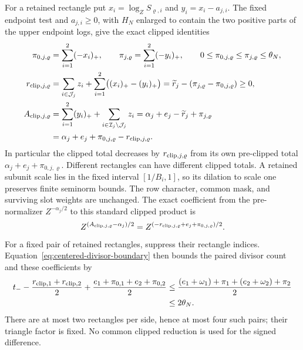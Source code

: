 \documentclass[11pt,a4paper]{article}
\numberwithin{equation}{section}
\numberwithin{figure}{section}
\theoremstyle{definition}
\theoremstyle{remark}
\begin{document}
For a retained rectangle put
\(x_i=\log_ZS_{\varrho,i}\) and \(y_i=x_i-a_{j,i}\).  The fixed
endpoint test and \(a_{j,i}\ge0\), with \(H_N\) enlarged to contain
the two positive parts of the upper endpoint logs, give the exact clipped identities
\begin{equation}
 \begin{aligned}
 \pi_{0,j,\varrho}&=\sum_{i=1}^2(-x_i)_+,\qquad
 \pi_{j,\varrho}=\sum_{i=1}^2(-y_i)_+,
 \qquad 0\le\pi_{0,j,\varrho}\le\pi_{j,\varrho}\le\theta_N,\\
 r_{{\rm clip},j,\varrho}
 &=\sum_{i\in\mathcal J_j}z_i+
       \sum_{i=1}^2\bigl((x_i)_+-(y_i)_+\bigr)
 =\widetilde r_j-(\pi_{j,\varrho}-\pi_{0,j,\varrho})\ge0,\\
 A_{{\rm clip},j,\varrho}
 &=\sum_{i=1}^2(y_i)_++\sum_{i\in\mathcal I_j\setminus\mathcal J_j}z_i
 =\alpha_j+e_j-\widetilde r_j+\pi_{j,\varrho}\\
 &=\alpha_j+e_j+\pi_{0,j,\varrho}-r_{{\rm clip},j,\varrho}.
 \end{aligned}
 \label{eq:centered-clipped-rectangle}
\end{equation}
In particular the clipped total decreases by \(r_{{\rm clip},j,\varrho}\)
from its own pre-clipped total \(\alpha_j+e_j+\pi_{0,j,\varrho}\).
Different rectangles can have different clipped totals.  A retained
subunit scale lies in the fixed interval \([1/B_i,1]\), so its dilation
to scale one preserves finite seminorm bounds.  The row character, common
mask, and surviving slot weights are unchanged.  The exact coefficient
from the pre-normalizer \(Z^{-\alpha_j/2}\) to this standard clipped
product is
\[
 Z^{(A_{{\rm clip},j,\varrho}-\alpha_j)/2}
 =Z^{(-r_{{\rm clip},j,\varrho}+e_j+\pi_{0,j,\varrho})/2}.
\]
For a fixed pair of retained rectangles, suppress their rectangle indices.
Equation~\eqref{eq:centered-divisor-boundary} then bounds the paired
divisor count and these coefficients by
\begin{equation}
 \begin{split}
 t_- -\frac{r_{{\rm clip},1}+r_{{\rm clip},2}}2
     +\frac{e_1+\pi_{0,1}+e_2+\pi_{0,2}}2
 &\le\frac{(e_1+\omega_1)+\pi_1+(e_2+\omega_2)+\pi_2}{2}\\
 &\le2\theta_N.
 \end{split}
 \label{eq:centered-clipped-shell}
\end{equation}
There are at most two rectangles per side, hence at most four such pairs;
their triangle factor is fixed.  No common clipped reduction is used for
the signed difference.
\end{document}
